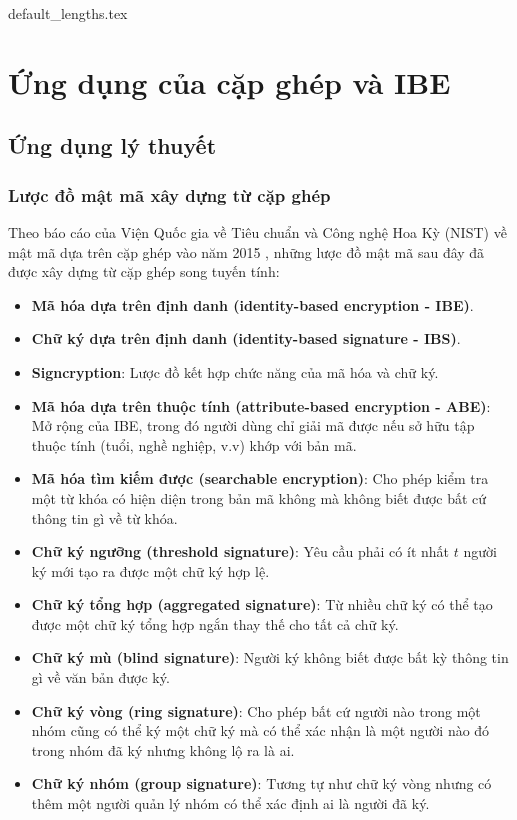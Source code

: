 \documentclass[class=report, crop=false]{standalone}
\begin{document}
	{default_lengths.tex}
	\chapter{Ứng dụng của cặp ghép và IBE}\label{chap:6}
	\section{Ứng dụng lý thuyết}
		\subsection{Lược đồ mật mã xây dựng từ cặp ghép}
			Theo báo cáo của Viện Quốc gia về Tiêu chuẩn và Công nghệ Hoa Kỳ (NIST) về mật mã dựa trên cặp ghép vào năm 2015 \cite{nist_report}, những lược đồ mật mã sau đây đã được xây dựng từ cặp ghép song tuyến tính:
			\vspace{-0.5\baselineskip}
			\begin{itemize}
				\item \textbf{Mã hóa dựa trên định danh (identity-based encryption - IBE)}.
				\item \textbf{Chữ ký dựa trên định danh (identity-based signature - IBS)}.
				\item \textbf{Signcryption}: Lược đồ kết hợp chức năng của mã hóa và chữ ký.
				\item \textbf{Mã hóa dựa trên thuộc tính (attribute-based encryption - ABE)}: Mở rộng của IBE, trong đó người dùng chỉ giải mã được nếu sở hữu tập thuộc tính (tuổi, nghề nghiệp, v.v) khớp với bản mã.
				\item \textbf{Mã hóa tìm kiếm được (searchable encryption)}: Cho phép kiểm tra một từ khóa có hiện diện trong bản mã không mà không biết được bất cứ thông tin gì về từ khóa.
				\item \textbf{Chữ ký ngưỡng (threshold signature)}: Yêu cầu phải có ít nhất $t$ người ký mới tạo ra được một chữ ký hợp lệ.
				\item \textbf{Chữ ký tổng hợp (aggregated signature)}: Từ nhiều chữ ký có thể tạo được một chữ ký tổng hợp ngắn thay thế cho tất cả chữ ký.
				\item \textbf{Chữ ký mù (blind signature)}: Người ký không biết được bất kỳ thông tin gì về văn bản được ký.
				\item \textbf{Chữ ký vòng (ring signature)}: Cho phép bất cứ người nào trong một nhóm cũng có thể ký một chữ ký mà có thể xác nhận là một người nào đó trong nhóm đã ký nhưng không lộ ra là ai.
				\item \textbf{Chữ ký nhóm (group signature)}: Tương tự như chữ ký vòng nhưng có thêm một người quản lý nhóm có thể xác định ai là người đã ký.
			\end{itemize}
\end{document}
